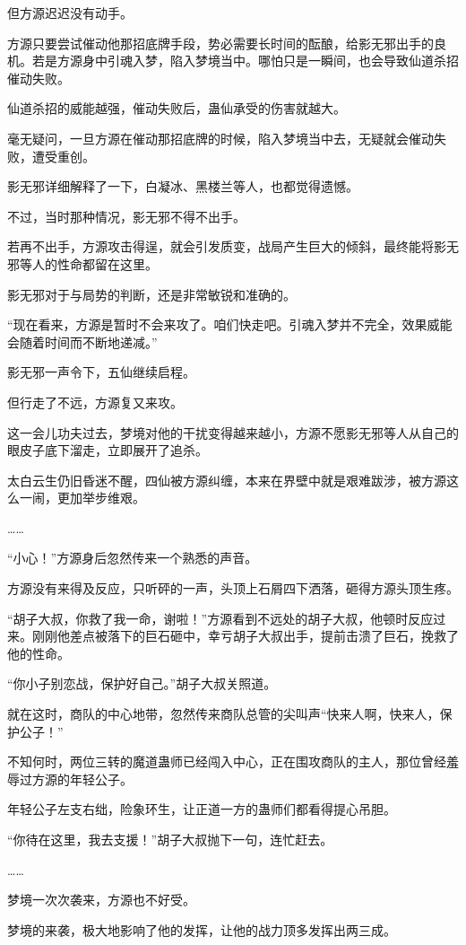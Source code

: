 \begin{this_body}
但方源迟迟没有动手。

方源只要尝试催动他那招底牌手段，势必需要长时间的酝酿，给影无邪出手的良机。若是方源身中引魂入梦，陷入梦境当中。哪怕只是一瞬间，也会导致仙道杀招催动失败。

仙道杀招的威能越强，催动失败后，蛊仙承受的伤害就越大。

毫无疑问，一旦方源在催动那招底牌的时候，陷入梦境当中去，无疑就会催动失败，遭受重创。

影无邪详细解释了一下，白凝冰、黑楼兰等人，也都觉得遗憾。

不过，当时那种情况，影无邪不得不出手。

若再不出手，方源攻击得逞，就会引发质变，战局产生巨大的倾斜，最终能将影无邪等人的性命都留在这里。

影无邪对于与局势的判断，还是非常敏锐和准确的。

“现在看来，方源是暂时不会来攻了。咱们快走吧。引魂入梦并不完全，效果威能会随着时间而不断地递减。”

影无邪一声令下，五仙继续启程。

但行走了不远，方源复又来攻。

这一会儿功夫过去，梦境对他的干扰变得越来越小，方源不愿影无邪等人从自己的眼皮子底下溜走，立即展开了追杀。

太白云生仍旧昏迷不醒，四仙被方源纠缠，本来在界壁中就是艰难跋涉，被方源这么一闹，更加举步维艰。

……

“小心！”方源身后忽然传来一个熟悉的声音。

方源没有来得及反应，只听砰的一声，头顶上石屑四下洒落，砸得方源头顶生疼。

“胡子大叔，你救了我一命，谢啦！”方源看到不远处的胡子大叔，他顿时反应过来。刚刚他差点被落下的巨石砸中，幸亏胡子大叔出手，提前击溃了巨石，挽救了他的性命。

“你小子别恋战，保护好自己。”胡子大叔关照道。

就在这时，商队的中心地带，忽然传来商队总管的尖叫声“快来人啊，快来人，保护公子！”

不知何时，两位三转的魔道蛊师已经闯入中心，正在围攻商队的主人，那位曾经羞辱过方源的年轻公子。

年轻公子左支右绌，险象环生，让正道一方的蛊师们都看得提心吊胆。

“你待在这里，我去支援！”胡子大叔抛下一句，连忙赶去。

……

梦境一次次袭来，方源也不好受。

梦境的来袭，极大地影响了他的发挥，让他的战力顶多发挥出两三成。


\end{this_body}
